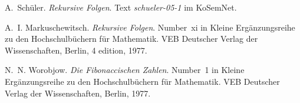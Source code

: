 \documentclass[11pt,a4paper]{article}
\begin{document}
\begin{thebibliography}{Wor77}

 A.~Schüler.  \newblock \emph{Rekursive Folgen}.  Text
  \emph{schueler-05-1} im KoSemNet.

 A.~I. Markuschewitsch.  \newblock
  \emph{{R}ekursive {F}olgen}.  \newblock Number~xi in Kleine
  Erg{\"a}nzungsreihe zu den Hochschulb{\"u}chern f{\"u}r Mathematik. VEB
  Deutscher Verlag der Wissenschaften, Berlin, 4 edition, 1977.

 N.~N. Worobjow.  \newblock \emph{Die Fibonaccischen
  Zahlen}.  \newblock Number~1 in Kleine Erg{\"a}nzungsreihe zu den
  Hochschulb{\"u}chern f{\"u}r Mathematik. VEB Deutscher Verlag der
  Wissenschaften, Berlin, 1977.

\end{thebibliography}
\end{document}
